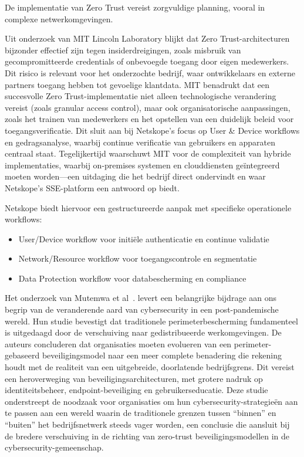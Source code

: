 De implementatie van Zero Trust vereist zorgvuldige planning, vooral in complexe netwerkomgevingen.

Uit onderzoek van MIT Lincoln Laboratory blijkt dat Zero Trust-architecturen bijzonder effectief zijn tegen insiderdreigingen, zoals misbruik van gecompromitteerde credentials of onbevoegde toegang door eigen medewerkers. 
Dit risico is relevant voor het onderzochte bedrijf, waar ontwikkelaars en externe partners toegang hebben tot gevoelige klantdata. 
MIT benadrukt dat een succesvolle Zero Trust-implementatie niet alleen technologische verandering vereist (zoals granular access control), maar ook organisatorische aanpassingen, zoals het trainen van medewerkers en het opstellen van een duidelijk beleid voor toegangsverificatie. 
Dit sluit aan bij Netskope’s focus op User \& Device workflows en gedragsanalyse, waarbij continue verificatie van gebruikers en apparaten centraal staat. 
Tegelijkertijd waarschuwt MIT voor de complexiteit van hybride implementaties, waarbij on-premises systemen en clouddiensten geïntegreerd moeten worden—een uitdaging die het bedrijf direct ondervindt en waar Netskope’s SSE-platform een antwoord op biedt.~\autocite{MIT2022}

Netskope biedt hiervoor een gestructureerde aanpak met specifieke operationele workflows:

\begin{itemize}
  \item User/Device workflow voor initiële authenticatie en continue validatie
  \item Network/Resource workflow voor toegangscontrole en segmentatie
  \item Data Protection workflow voor databescherming en compliance
\end{itemize}

Het onderzoek van Mutemwa et al~\autocite{ACM2021}. levert een belangrijke bijdrage aan ons begrip van de veranderende aard van cybersecurity in een post-pandemische wereld. Hun studie bevestigt dat traditionele perimeterbescherming fundamenteel is uitgedaagd door de verschuiving naar gedistribueerde werkomgevingen.
De auteurs concluderen dat organisaties moeten evolueren van een perimeter-gebaseerd beveiligingsmodel naar een meer complete benadering die rekening houdt met de realiteit van een uitgebreide, doorlatende bedrijfsgrens. Dit vereist een heroverweging van beveiligingsarchitecturen, met grotere nadruk op identiteitsbeheer, endpoint-beveiliging en gebruikerseducatie.
Deze studie onderstreept de noodzaak voor organisaties om hun cybersecurity-strategieën aan te passen aan een wereld waarin de traditionele grenzen tussen “binnen” en “buiten” het bedrijfsnetwerk steeds vager worden, een conclusie die aansluit bij de bredere verschuiving in de richting van zero-trust beveiligingsmodellen in de cybersecurity-gemeenschap.